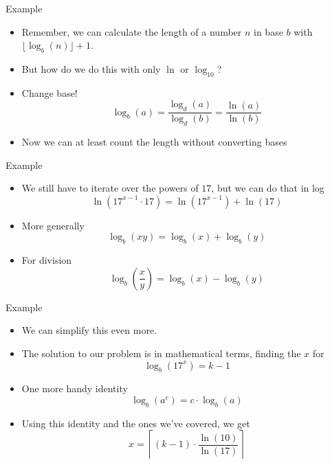 \documentclass[10pt]{beamer}
\newcommand{\bi}{\begin{itemize}}
\newcommand{\ei}{\end{itemize}}
\begin{document}
\begin{frame}[fragile]{Example}
  \vspace{40pt}
  \bi
    \item Remember, we can calculate the length of a number $n$ in base $b$
      with $\lfloor \log_b(n) \rfloor + 1$.
    \item But how do we do this with only $\ln$ or $\log_{10}$?
    \item Change base!
      \[
        \log_b(a) = \frac{\log_d(a)}{\log_d(b)} = \frac{\ln(a)}{\ln(b)}
      \]
    \item Now we can at least count the length without converting bases
  \ei
\end{frame}

\begin{frame}{Example}
  \vspace{20pt}
  \bi
    \item We still have to iterate over the powers of $17$, but we can do that in log
      \[
        \ln(17^{x-1} \cdot 17) = \ln(17^{x-1}) + \ln(17)
      \]
    \item More generally
      \[
        \log_b(xy) = \log_b(x) + \log_b(y)
      \]
    \item For division
      \[
        \log_b(\frac{x}{y}) = \log_b(x) - \log_b(y)
      \]
  \ei
\end{frame}

\begin{frame}{Example}
  \vspace{20pt}
  \bi
    \item We can simplify this even more.
    \item The solution to our problem is in mathematical terms, finding the $x$ for
      \[
        \log_b(17^x) = k - 1
      \]
    \item One more handy identity
      \[
        \log_b(a^c) = c \cdot \log_b(a)
      \]
    \item Using this identity and the ones we've covered, we get
      \[
        x = \left\lceil (k-1) \cdot \frac{\ln(10)}{\ln(17)} \right\rceil
      \]
  \ei
\end{frame}
\end{document}
